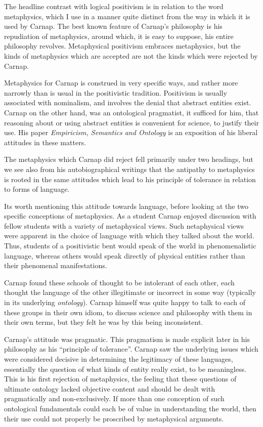 The headline contrast with logical positivism is in relation to the
word metaphysics, which I use in a manner quite distinct from the way
in which it is used by Carnap.
The best known feature of Carnap's philosophy is his repudiation of
metaphysics, around which, it is easy to suppose, his entire philosophy
revolves.
Metaphysical positivism embraces metaphysics, but the kinds of
metaphysics which are accepted are not the kinds which were rejected
by Carnap.

Metaphysics for Carnap is construed in very specific ways, and rather
more narrowly than is usual in the positivistic tradition.
Positivism is usually associated with nominalism, and involves the
denial that abstract entities exist.
Carnap on the other hand, was an ontological pragmatist, it sufficed
for him, that reasoning about or using abstract entities is convenient for science, to
justify their use.
His paper \emph{Empiricism, Semantics and Ontology} is an exposition
of his liberal attitudes in these matters.

The metaphysics which Carnap did reject fell primarily under two
headings, but we see also from his autobiographical writings that the
antipathy to metaphysics is rooted in the same attitudes which lead to
his principle of tolerance in relation to forms of language.

Its worth mentioning this attitude towards language, before looking at
the two specific conceptions of metaphysics.
As a student Carnap enjoyed discussion with fellow students with a
variety of metaphysical views.
Such netaphysical views were apparent in the choice of language with
which they talked about the world.
Thus, students of a positivistic bent would speak of the world in
phenomenalistic language, whereas others would speak directly of
physical entities rather than their phenomenal manifestations.

Carnap found these schools of thought to be intolerant of each other,
each thought the language of the other illegitimate or incorrect in
some way (typically in its underlying {\it ontology}).
Carnap himself was quite happy to talk to each of these groups in
their own idiom, to discuss science and philosophy with them in their
own terms, but they felt he was by this being inconsistent.

Carnap's attitude was pragmatic.
This pragmatism is made explicit later in his philosophy as his
``principle of tolerance''.
Carnap saw the underlying issues which were considered decisive in
determining the legitimacy of these languages, essentially the
question of what kinds of entity really exist, to be meaningless.
This is his first rejection of metaphysics, the feeling that these
questions of ultimate ontology lacked objective content and should be dealt
with pragmatically and non-exclusively.
If more than one conception of such ontological fundamentals could
each be of value in understanding the world, then their use could not
properly be proscribed by metaphysical arguments.

